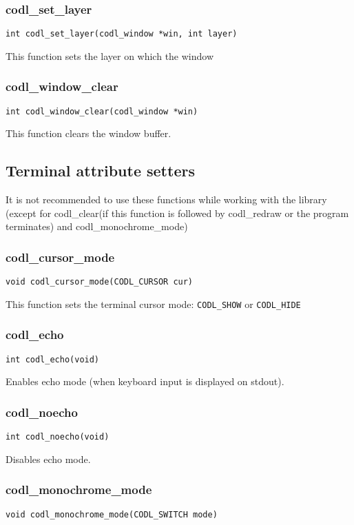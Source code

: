 \documentclass{article}
\newcommand{\fstep}{\vspace{3mm}\noindent}
\begin{document}
\subsubsection{codl\_set\_layer}
{\tt int codl\_set\_layer(codl\_window *win, int layer)}

\fstep{} This function sets the layer on which the window

\subsubsection{codl\_window\_clear}
{\tt int codl\_window\_clear(codl\_window *win)}

\fstep{} This function clears the window buffer.

\subsection{Terminal attribute setters}
It is not recommended to use these functions while working with the library
(except for codl\_clear(if this function is followed by codl\_redraw or the
program terminates) and codl\_monochrome\_mode)

\subsubsection{codl\_cursor\_mode}
{\tt void codl\_cursor\_mode(CODL\_CURSOR cur)}

\fstep{} This function sets the terminal cursor mode: {\tt CODL\_SHOW} or
{\tt CODL\_HIDE}

\subsubsection{codl\_echo}
{\tt int codl\_echo(void)}

\fstep{} Enables echo mode (when keyboard input is displayed on stdout).

\subsubsection{codl\_noecho}
{\tt int codl\_noecho(void)}

\fstep{} Disables echo mode.

\subsubsection{codl\_monochrome\_mode}
{\tt void codl\_monochrome\_mode(CODL\_SWITCH mode)}
\end{document}
